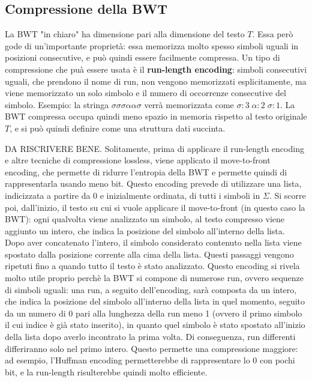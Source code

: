 \subsection*{Compressione della BWT}
La BWT "in chiaro" ha dimensione pari alla dimensione del testo $T$. Essa però
gode di un'importante proprietà: essa memorizza molto spesso simboli uguali in
posizioni consecutive, e può quindi essere facilmente compressa. Un tipo di
compressione che puà essere usata è il \textbf{run-length encoding}: simboli
consecutivi uguali, che prendono il nome di run, non vengono memorizzati
esplicitamente, ma viene memorizzato
un solo simbolo e il numero di occorrenze consecutive del simbolo.
Esempio: la stringa $\sigma \sigma \sigma \alpha \alpha \sigma$ verrà
memorizzata come $\sigma : 3 \; \alpha : 2 \; \sigma : 1$.
La BWT compressa occupa quindi meno spazio in memoria rispetto al testo
originale $T$, e si può quindi definire come una struttura dati succinta.

DA RISCRIVERE BENE.
Solitamente, prima di applicare il run-length encoding e altre tecniche
di compressione lossless, viene applicato il move-to-front encoding, che
permette di ridurre l'entropia della BWT e permette quindi di rappresentarla
usando meno bit.
Questo encoding prevede di utilizzare una lista, indicizzata a partire da 0 e
inizialmente ordinata, di
tutti i simboli in $\Sigma$. Si scorre poi, dall'inizio, il testo su cui
si vuole applicare il move-to-front (in questo caso la BWT): ogni qualvolta
viene analizzato un simbolo, al testo compresso viene aggiunto un intero,
che indica la posizione del simbolo all'interno della lista.
Dopo aver concatenato l'intero, il simbolo considerato contenuto nella lista
viene spostato dalla posizione corrente alla cima della lista.
Questi passaggi vengono ripetuti fino a quando tutto il testo è stato analizzato.
Questo encoding si rivela molto utile proprio perchè la BWT si compone di
numerose run, ovvero sequenze di simboli uguali: una run, a seguito dell'encoding,
sarà composta da un intero, che indica la posizione del simbolo all'interno
della lista in quel momento, seguito da un numero di 0 pari alla lunghezza della
run meno 1 (ovvero il primo simbolo il cui indice è già stato inserito),
in quanto quel simbolo è stato spostato all'inizio della lista dopo averlo
incontrato la prima volta.
Di conseguenza, run differenti differiranno solo nel primo intero.
Questo permette una compressione maggiore: ad esempio, l'Huffman encoding
permetterebbe di rappresentare lo 0 con pochi bit, e la run-length risulterebbe
quindi molto efficiente.


